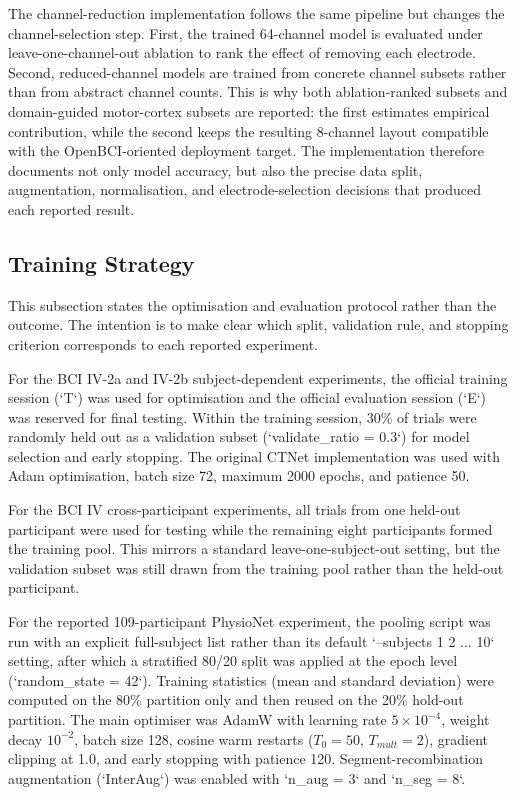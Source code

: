 \documentclass[12pt, a4paper]{article}
\begin{document}
The channel-reduction implementation follows the same pipeline but changes the channel-selection step. First, the trained 64-channel model is evaluated under leave-one-channel-out ablation to rank the effect of removing each electrode. Second, reduced-channel models are trained from concrete channel subsets rather than from abstract channel counts. This is why both ablation-ranked subsets and domain-guided motor-cortex subsets are reported: the first estimates empirical contribution, while the second keeps the resulting 8-channel layout compatible with the OpenBCI-oriented deployment target. The implementation therefore documents not only model accuracy, but also the precise data split, augmentation, normalisation, and electrode-selection decisions that produced each reported result.

\subsection{Training Strategy}

This subsection states the optimisation and evaluation protocol rather than the outcome. The intention is to make clear which split, validation rule, and stopping criterion corresponds to each reported experiment.

For the BCI IV-2a and IV-2b subject-dependent experiments, the official training session (`T`) was used for optimisation and the official evaluation session (`E`) was reserved for final testing. Within the training session, 30\% of trials were randomly held out as a validation subset (`validate\_ratio = 0.3`) for model selection and early stopping. The original CTNet implementation was used with Adam optimisation, batch size 72, maximum 2000 epochs, and patience 50.

For the BCI IV cross-participant experiments, all trials from one held-out participant were used for testing while the remaining eight participants formed the training pool. This mirrors a standard leave-one-subject-out setting, but the validation subset was still drawn from the training pool rather than the held-out participant.

For the reported 109-participant PhysioNet experiment, the pooling script was run with an explicit full-subject list rather than its default `--subjects 1 2 ... 10` setting, after which a stratified 80/20 split was applied at the epoch level (`random\_state = 42`). Training statistics (mean and standard deviation) were computed on the 80\% partition only and then reused on the 20\% hold-out partition. The main optimiser was AdamW with learning rate $5 \times 10^{-4}$, weight decay $10^{-2}$, batch size 128, cosine warm restarts ($T_0 = 50$, $T_{mult} = 2$), gradient clipping at 1.0, and early stopping with patience 120. Segment-recombination augmentation (`InterAug`) was enabled with `n\_aug = 3` and `n\_seg = 8`.
\end{document}
